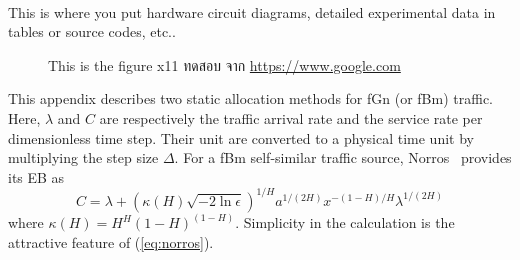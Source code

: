 \documentclass[12pt,oneside,openright,a4paper]{cpe-thai-project}
\begin{document}


\makeatletter
\g@addto@macro{\UrlBreaks}{\UrlOrds}
\makeatother
% 




 \\

This is where you put hardware circuit diagrams, detailed experimental data in tables or source codes, etc.. \\ \bigskip


 \begin{figure}[!h]
\caption{This is the figure x11 ทดสอบ จาก \href{https://www.google.com} {https://www.google.com}}\label{fig:x1}
\end{figure}


This appendix describes two static allocation methods for fGn (or fBm)
traffic. Here, $\lambda$ and $C$ are respectively the traffic arrival
rate and the service rate per dimensionless time step. Their unit are
converted to a physical time unit by multiplying the step size
$\Delta$. For a fBm self-similar traffic source,
Norros~\cite{norros95} provides its EB as
\begin{equation}\label{eq:norros}
  C = \lambda + (\kappa(H)\sqrt{-2\ln\epsilon})^{1/H}a^{1/(2H)}x^{-(1-H)/H}\lambda^{1/(2H)}
\end{equation}
where $\kappa(H) = H^H(1-H)^{(1-H)}$. Simplicity in the calculation is
the attractive feature of (\ref{eq:norros}).
\end{document}
